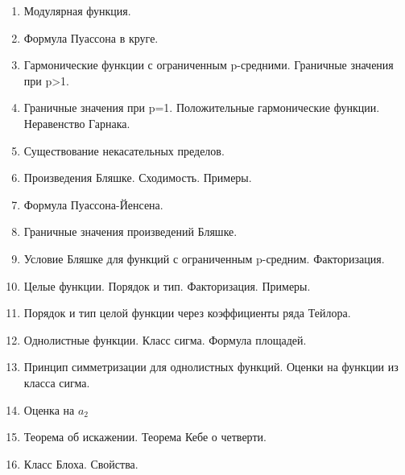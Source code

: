 \documentclass[12pt,a4paper]{article} %
\begin{document}
\begin{enumerate}
		\item Модулярная функция.
		\item Формула Пуассона в круге.
		\item Гармонические функции с ограниченным p-средними. Граничные значения при p>1.
		\item Граничные значения при p=1. Положительные гармонические функции. Неравенство Гарнака.
		\item Существование некасательных пределов.
		\item Произведения Бляшке. Сходимость. Примеры.
		\item Формула Пуассона-Йенсена.
		\item Граничные значения произведений Бляшке.
		\item Условие Бляшке для функций с ограниченным p-средним. Факторизация.
		\item Целые функции. Порядок и тип. Факторизация. Примеры.
		\item Порядок и тип целой функции через коэффициенты ряда Тейлора.
		\item Однолистные функции. Класс сигма. Формула площадей.
		\item Принцип симметризации для однолистных функций. Оценки на функции из класса сигма.
		\item Оценка на $a_2$
		\item Теорема об искажении. Теорема Кебе о четверти.
		\item Класс Блоха. Свойства.
	\end{enumerate}
\end{document}
